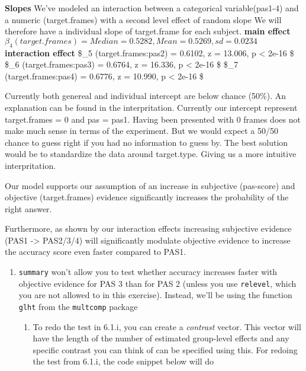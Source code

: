 \documentclass[
]{article}
\providecommand{\tightlist}{%
  \setlength{\itemsep}{0pt}\setlength{\parskip}{0pt}}
\begin{document}
\textbf{Slopes} We've modeled an interaction between a categorical
variable(pas1-4) and a numeric (target.frames) with a second level
effect of random slope We will therefore have a individual slope of
target.frame for each subject. \textbf{main effect}
\(\beta_4 (target.frames) = Median = 0.5282, Mean = 0.5269, sd = 0.0234\)
\textbf{interaction effect} \$\beta\_5 (target.frames:pas2) = 0.6102, z
= 13.006, p \textless{} 2e-16 \$ \$\beta\_6 (target.frames:pas3) =
0.6764, z = 16.336, p \textless{} 2e-16 \$ \$\beta\_7
(target.frames:pas4) = 0.6776, z = 10.990, p \textless{} 2e-16 \$

Currently both genereal and individual intercept are below chance
(50\%). An explanation can be found in the interpritation. Currently our
intercept represent target.frames = 0 and pas = pas1. Having been
presented with 0 frames does not make much sense in terms of the
experiment. But we would expect a 50/50 chance to guess right if you had
no information to guess by. The best solution would be to standardize
the data around target.type. Giving us a more intuitive interpritation.

Our model supports our assumption of an increase in subjective
(pas-score) and objective (target.frames) evidence significantly
increases the probability of the right answer.

Furthermore, as shown by our interaction effects increasing subjective
evidence (PAS1 -\textgreater{} PAS2/3/4) will significantly modulate
objective evidence to increase the accuracy score even faster compared
to PAS1.

\begin{enumerate}
\def\labelenumi{\arabic{enumi})}
\setcounter{enumi}{1}
\tightlist
\item
  \texttt{summary} won't allow you to test whether accuracy increases
  faster with objective evidence for PAS 3 than for PAS 2 (unless you
  use \texttt{relevel}, which you are not allowed to in this exercise).
  Instead, we'll be using the function \texttt{glht} from the
  \texttt{multcomp} package

  \begin{enumerate}
  \def\labelenumii{\roman{enumii}.}
  \tightlist
  \item
    To redo the test in 6.1.i, you can create a \emph{contrast} vector.
    This vector will have the length of the number of estimated
    group-level effects and any specific contrast you can think of can
    be specified using this. For redoing the test from 6.1.i, the code
    snippet below will do
  \end{enumerate}
\end{enumerate}
\end{document}

